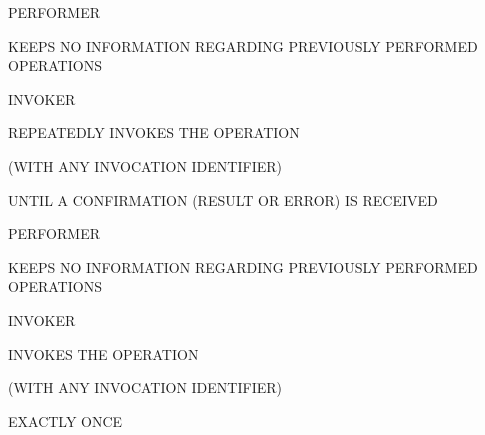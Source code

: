 \begin{bwslide}

\begin{nrtc}
\item	PERFORMER
    \begin{nrtc}
    \item	KEEPS NO INFORMATION REGARDING PREVIOUSLY PERFORMED OPERATIONS
    \end{nrtc}

\item	INVOKER
    \begin{nrtc}
    \item	REPEATEDLY INVOKES THE OPERATION
	\begin{nrtc}
	\item	(WITH ANY INVOCATION IDENTIFIER)
	\end{nrtc}
		UNTIL A CONFIRMATION (RESULT OR ERROR) IS RECEIVED
    \end{nrtc}
\end{nrtc}
\end{bwslide}


\begin{bwslide}

\begin{nrtc}
\item	PERFORMER
    \begin{nrtc}
    \item	KEEPS NO INFORMATION REGARDING PREVIOUSLY PERFORMED OPERATIONS
    \end{nrtc}

\item	INVOKER
    \begin{nrtc}
    \item	INVOKES THE OPERATION
	\begin{nrtc}
	\item	(WITH ANY INVOCATION IDENTIFIER)
	\end{nrtc}
		EXACTLY ONCE
    \end{nrtc}
\end{nrtc}
\end{bwslide}




